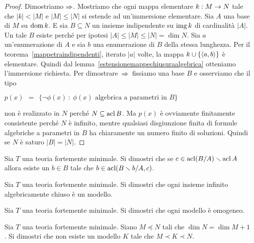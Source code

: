 \begin{proof}
Dimostriamo $\Rightarrow$. Mostriamo che ogni mappa elementare $k:M\rightarrow N$ tale che $|k|<|M|$ e $|M|\le|N|$ si estende ad un'immersione elementare. Sia $A$ una base di $M$ su $\mathop{\rm dom} k$.  E sia $B\subseteq N$ un insieme indipendente su $\mathop{\rm img} k$ di cardinalit\`a $|A|$. Un tale $B$ esiste perch\'e per ipotesi $|A|\le|M|\le|N|=\dim N$. Sia $a$ un'enumerazione di $A$ e sia $b$ una enumerazione di $B$ della stessa lunghezza. Per il teorema~\ref{mappetraindipendenti}, iterato $|a|$ volte, la mappa $k\cup\{\langle a,b\rangle\}$ \`e elementare. Quindi dal lemma~\ref{estensionemappechiusuraalgebrica} otteniamo l'immersione richiesta.
Per dimostrare $\,\Rightarrow\,$ fissiamo una base $B$ e osserviamo che il tipo

\hfil $p(x)\ \ =\ \ \Big\{\neg\phi(x)\ :\ \phi(x)\textrm{ algebrica a parametri in }B\Big\}$

non \`e realizzato in $N$ perch\'e $N\subseteq\mathop{\rm acl} B$. Ma $p(x)$ \`e ovviamente finitamente consistente perch\'e $N$ \`e infinito, mentre qualsiasi disgiunzione finita di formule algebriche a parametri in $B$ ha chiaramente un numero finito di soluzioni. Quindi se $N$ \`e saturo $|B|=|N|$.
\end{proof}

\begin{exercise}\label{scambioex}
Sia $T$ una teoria fortemente minimale. Si dimostri che se $c\in\mathop{\rm acl}(B/A)\smallsetminus\mathop{\rm acl} A$ allora esiste un $b\in B$ tale che $b\in\mathop{\rm acl}(B\smallsetminus b/A,c)$.\QED 
\end{exercise}

\begin{exercise}
Sia $T$ una teoria fortemente minimale. Si dimostri che ogni insieme infinito algebricamente chiuso \`e un modello.\QED 
\end{exercise}

\begin{exercise}
Sia $T$ una teoria fortemente minimale. Si dimostri che ogni modello \`e omogeneo.\QED 
\end{exercise}

\begin{exercise}
Sia $T$ una teoria fortemente minimale. Siano $M\preceq N$ tali che $\dim N=\dim M+1$. Si dimostri che non esiste un modello $K$ tale che $M\prec K\prec N$.\QED 
\end{exercise}



% 

